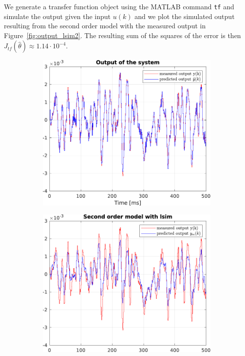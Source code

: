 We generate a transfer function object using the MATLAB command \texttt{tf} and simulate the output given the input $u(k)$ and we plot the simulated output resulting from the second order model with the measured output in Figure~\ref{fig:output_lsim2}.
The resulting sum of the squares of the error is then $ J_{tf}(\hat{\theta}) \approx 1.14 \cdot 10^{-4}$. 
\begin{figure}[h!]
	\centering
	\begin{subfigure}{.49\textwidth}
		\includegraphics[width=\textwidth]{figures/output_arx.pdf}
		\label{fig:output_arx}
	\end{subfigure}\hfill
	\begin{subfigure}{.49\textwidth}
		\includegraphics[width=\textwidth]{figures/output_lsim2.pdf}

\end{subfigure}
\end{figure}
